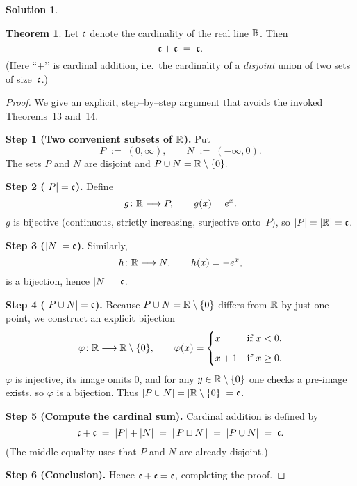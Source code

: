 \documentclass[12pt]{article}
\theoremstyle{definition} %
\newtheorem{solution}{Solution}
\newtheorem{theorem}{Theorem}
\theoremstyle{plain} %
\begin{document}
    \begin{solution}
      \begin{theorem}
        Let $\frak c$ denote the cardinality of the real line $\Bbb R$.
        Then
        \[
           \frak c+\frak c \;=\; \frak c .
        \]
        (Here “$+$’’ is cardinal addition, i.e.\ the cardinality of a
        \emph{disjoint} union of two sets of size~$\frak c$.)
        \end{theorem}
        
        \begin{proof}
        We give an explicit, step--by--step argument that avoids the
        invoked Theorems~13 and~14.
        
        \medskip
        \textbf{Step 1 (Two convenient subsets of $\Bbb R$).}
        Put
        \[
          P \;:=\; (0,\infty), \qquad
          N \;:=\; (-\infty,0).
        \]
        The sets $P$ and $N$ are disjoint and
        \(
          P\cup N = \Bbb R\setminus\{0\}.
        \)
        
        \medskip
        \textbf{Step 2 ($|P|=\frak c$).}
        Define
        \[
          g\colon \Bbb R \longrightarrow P,
          \qquad
          g(x)=e^{x}.
        \]
        $g$ is bijective (continuous, strictly increasing, surjective onto~$P$),
        so $|P| = |\Bbb R| = \frak c$.
        
        \medskip
        \textbf{Step 3 ($|N|=\frak c$).}
        Similarly,
        \[
          h\colon \Bbb R \longrightarrow N,
          \qquad
          h(x) = -e^{x},
        \]
        is a bijection, hence $|N|=\frak c$.
        
        \medskip
        \textbf{Step 4 ($|P\cup N|=\frak c$).}
        Because $P\cup N = \Bbb R\setminus\{0\}$ differs from $\Bbb R$
        by just one point, we construct an explicit bijection
        \[
          \varphi\colon \Bbb R \longrightarrow \Bbb R\setminus\{0\},
          \qquad
          \varphi(x)=
          \begin{cases}
             x           & \text{if }x<0,\\[6pt]
             x+1         & \text{if }x\ge 0.
          \end{cases}
        \]
        $\varphi$ is injective, its image omits $0$, and for any
        $y\in\Bbb R\setminus\{0\}$ one checks a pre‑image exists,
        so $\varphi$ is a bijection.
        Thus $|P\cup N| = |\Bbb R\setminus\{0\}| = \frak c$.
        
        \medskip
        \textbf{Step 5 (Compute the cardinal sum).}
        Cardinal addition is defined by
        \[
          \frak c+\frak c \;=\; |P| + |N|
          \;=\; |\,P \sqcup N\,|
          \;=\; |P\cup N|
          \;=\; \frak c .
        \]
        (The middle equality uses that $P$ and $N$ are already disjoint.)
        
        \medskip
        \textbf{Step 6 (Conclusion).}
        Hence $\frak c+\frak c=\frak c$, completing the proof.
        \end{proof}      
    \end{solution}
\end{document}
